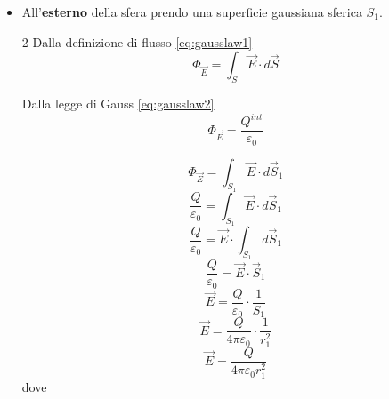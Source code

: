 \documentclass[twoside]{article}
\begin{document}
\begin{itemize}
    \item All'\textbf{esterno} della sfera prendo una superficie gaussiana sferica $S_1$.\\
          \begin{multicols}{2}
              \noindent
              Dalla definizione di flusso \ref{eq:gausslaw1}
              \begin{equation*}
                  \Phi_{\vec{E}} = \displaystyle \int_{S} \vec{E} \cdot d\vec{S}
              \end{equation*}
              \columnbreak
              \noindent

              Dalla legge di Gauss \ref{eq:gausslaw2}
              \begin{equation*}
                  \Phi_{\vec{E}} = \displaystyle \frac{Q^{int}}{\varepsilon_0}
              \end{equation*}
          \end{multicols}
          \begin{equation*}
              \Phi_{\vec{E}} = \displaystyle \int_{S_1} \vec{E} \cdot d\vec{S}_1
          \end{equation*}
          \begin{equation*}
              \displaystyle \frac{Q}{\varepsilon_0} = \displaystyle \int_{S_1} \vec{E} \cdot d\vec{S}_1
          \end{equation*}
          \begin{equation*}
              \displaystyle \frac{Q}{\varepsilon_0} = \vec{E} \cdot \displaystyle \int_{S_1} d\vec{S}_1
          \end{equation*}
          \begin{equation*}
              \displaystyle \frac{Q}{\varepsilon_0} = \vec{E} \cdot \vec{S}_1
          \end{equation*}
          \begin{equation*}
              \vec{E} = \displaystyle \frac{Q}{\varepsilon_0} \cdot \frac{1}{S_1}
          \end{equation*}
          \begin{equation}
              \vec{E} = \displaystyle \frac{Q}{4\pi \varepsilon_0} \cdot \frac{1}{r_{1}^{2}}
          \end{equation}
          \begin{equation}
              \boxed{\vec{E} = \displaystyle \frac{Q}{4\pi \varepsilon_0 r_{1}^2}}
          \end{equation}
          dove

\end{itemize}
\end{document}
